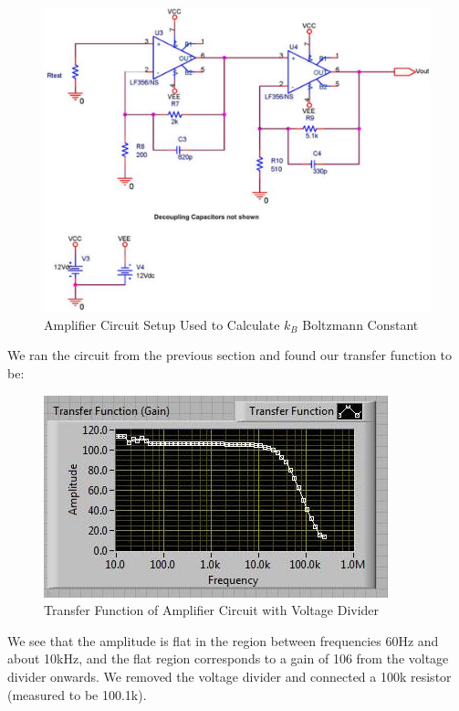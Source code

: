 \documentclass{article}
\begin{document}
\subsection{}
    \begin{figure}[H]
        \centering
        \includegraphics[scale = 0.5]{5.png}
        \caption{Amplifier Circuit Setup Used to Calculate $k_B$ Boltzmann Constant \cite{lab9}}
        \label{fig:my_label}
    \end{figure}
    We ran the circuit from the previous section and found our transfer function to be:
    \begin{figure}[H]
        \centering
        \includegraphics[scale = 0.8]{5b.jpeg}
        \caption{Transfer Function of Amplifier Circuit with Voltage Divider \cite{lab9}}
        \label{fig:my_label}
    \end{figure}
    We see that the amplitude is flat in the region between frequencies 60Hz and about 10kHz, and the flat region corresponds to a gain of 106 from the voltage divider onwards. We removed the voltage divider and connected a 100k resistor (measured to be 100.1k).
    
\end{document}
